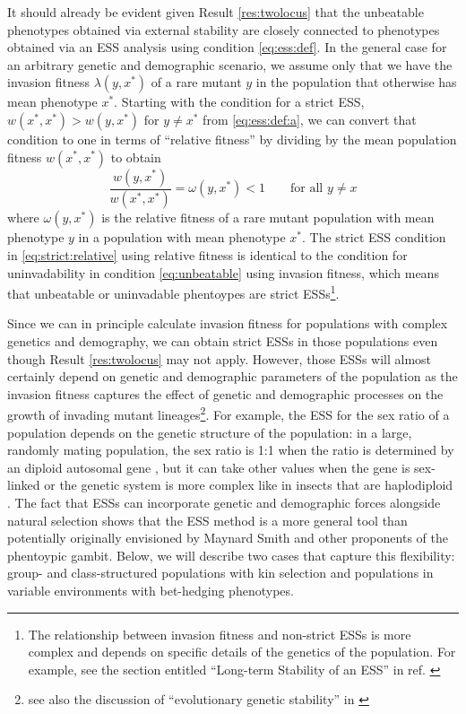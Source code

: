 \documentclass[11pt]{article}
\newcommand{\ess}[1]{#1^*}
\newcommand{\eig}{\lambda}
\begin{document}
It should already be evident given Result \ref{res:twolocus} that the unbeatable phenotypes obtained via external stability are closely connected to phenotypes obtained via an ESS analysis using condition \eqref{eq:ess:def}. In the general case for an arbitrary genetic and demographic scenario, we assume only that we have the invasion fitness $\eig(y, \ess{x})$ of a rare mutant $y$ in the population that otherwise has mean phenotype $\ess{x}$. Starting with the condition for a strict ESS, $w(\ess{x}, \ess{x}) > w(y, \ess{x})$ for $y \ne \ess{x}$ from \eqref{eq:ess:def:a}, we can convert that condition to one in terms of ``relative fitness'' by dividing by the mean population fitness $w(\ess{x}, \ess{x})$ to obtain
\begin{equation}
  \label{eq:strict:relative}
  \frac{w(y, \ess{x})}{w(\ess{x}, \ess{x})} = \omega(y, \ess{x}) < 1 \qquad \text{for all } y \ne x
\end{equation}
where $\omega(y, \ess{x})$ is the relative fitness of a rare mutant population with mean phenotype $y$ in a population with mean phenotype $\ess{x}$. The strict ESS condition in \eqref{eq:strict:relative} using relative fitness is identical to the condition for uninvadability in condition \eqref{eq:unbeatable} using invasion fitness, which means that unbeatable or uninvadable phentoypes are strict ESSs\footnote{The relationship between invasion fitness and non-strict ESSs is more complex and depends on specific details of the genetics of the population. For example, see the section entitled ``Long-term Stability of an ESS'' in ref. \cite{Eshel:Feldman:1998}}.

Since we can in principle calculate invasion fitness for populations with complex genetics and demography, we can obtain strict ESSs in those populations even though Result \ref{res:twolocus} may not apply. However, those ESSs will almost certainly depend on genetic and demographic parameters of the population as the invasion fitness captures the effect of genetic and demographic processes on the growth of invading mutant lineages\footnote{see also the discussion of ``evolutionary genetic stability'' in \cite[pp. 505--506]{Eshel:1996}}. For example, the ESS for the sex ratio of a population depends on the genetic structure of the population: in a large, randomly mating population, the sex ratio is 1:1 when the ratio is determined by an diploid autosomal gene \cite{Fisher:1958,Hamilton:1967,Eshel:Feldman:1982}, but it can take other values when the gene is sex-linked or the genetic system is more complex like in insects that are haplodiploid \cite{Hamilton:1967,Eshel:Feldman:1982a}. The fact that ESSs can incorporate genetic and demographic forces alongside natural selection shows that the ESS method is a more general tool than potentially originally envisioned by Maynard Smith and other proponents of the phentoypic gambit. Below, we will describe two cases that capture this flexibility: group- and class-structured populations with kin selection and populations in variable environments with bet-hedging phenotypes.
\end{document}
